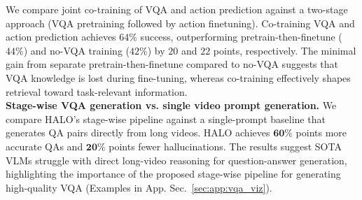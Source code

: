 We compare joint co-training of VQA and action prediction against a two-stage approach (VQA pretraining followed by action finetuning). Co-training VQA and action prediction achieves $64\%$ success, outperforming pretrain-then-finetune ($44\%$) and no-VQA training ($42\%$) by $20$ and $22$ points, respectively. The minimal gain from separate pretrain-then-finetune compared to no-VQA suggests that VQA knowledge is lost during fine-tuning, whereas co-training effectively shapes retrieval toward task-relevant information.
\\
\textbf{Stage-wise VQA generation vs. single video prompt generation.}
We compare HALO's stage-wise pipeline against a single-prompt baseline that generates QA pairs directly from long videos.
HALO achieves $\mathbf{60\%}$ points more accurate QAs and $\mathbf{20\%}$ points fewer hallucinations.
The results suggest SOTA VLMs struggle with direct long-video reasoning for question-answer generation, highlighting the importance of the proposed stage-wise pipeline for generating high-quality VQA (Examples in App. Sec.~\ref {sec:app:vqa_viz}).
